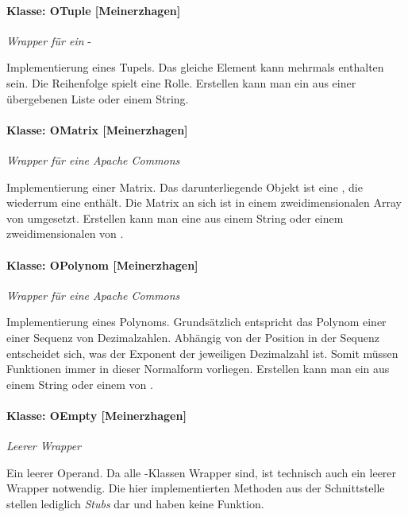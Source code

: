 \paragraph{Klasse: OTuple [Meinerzhagen]}

\textit{Wrapper für ein} -

Implementierung eines Tupels. Das gleiche Element kann mehrmals enthalten sein. Die Reihenfolge spielt eine Rolle. Erstellen kann man ein  aus einer übergebenen Liste oder einem String.

\paragraph{Klasse: OMatrix [Meinerzhagen]}

\textit{Wrapper für eine Apache Commons} 

Implementierung einer Matrix. Das darunterliegende Objekt ist eine , die wiederrum eine  enthält. Die Matrix an sich ist in einem zweidimensionalen Array von  umgesetzt. Erstellen kann man eine  aus einem String oder einem zweidimensionalen  von .


\paragraph{Klasse: OPolynom [Meinerzhagen]}

\textit{Wrapper für eine Apache Commons} 

Implementierung eines Polynoms. Grundsätzlich entspricht das Polynom einer einer Sequenz von Dezimalzahlen. Abhängig von der Position in der Sequenz entscheidet sich, was der Exponent der jeweiligen Dezimalzahl ist. Somit müssen Funktionen immer in dieser Normalform vorliegen. Erstellen kann man ein  aus einem String oder einem  von .

\paragraph{Klasse: OEmpty [Meinerzhagen]}

\textit{Leerer Wrapper}

Ein leerer Operand. Da alle -Klassen Wrapper sind, ist technisch auch ein leerer Wrapper notwendig. Die hier implementierten Methoden aus der Schnittstelle stellen lediglich \textit{Stubs} dar und haben keine Funktion.

